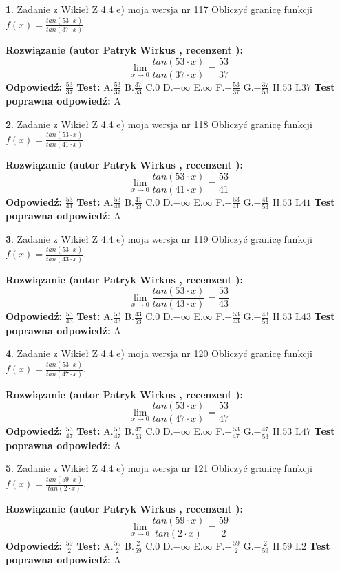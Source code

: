 \documentclass[12pt, a4paper]{article}
\theoremstyle{definition} %
\newtheorem{zad}{}
\newcommand{\zadStart}[1]{\begin{zad}#1\newline}
\newcommand{\zadStop}{\end{zad}}
\newcommand{\rozwStart}[2]{\noindent \textbf{Rozwiązanie (autor #1 , recenzent #2): }\newline}
\newcommand{\rozwStop}{\newline}
\newcommand{\odpStart}{\noindent \textbf{Odpowiedź:}\newline}
\newcommand{\odpStop}{\newline}
\newcommand{\testStart}{\noindent \textbf{Test:}\newline}
\newcommand{\testStop}{\newline}
\newcommand{\kluczStart}{\noindent \textbf{Test poprawna odpowiedź:}\newline}
\newcommand{\kluczStop}{\newline}
\begin{document}
\zadStart{Zadanie z Wikieł Z 4.4 e) moja wersja nr 117}
Obliczyć granicę funkcji $f(x)=\frac{tan(53\cdot x)}{tan(37\cdot x)}$.
\zadStop
\rozwStart{Patryk Wirkus}{}
$$\lim\limits_{x\to 0}\frac{tan(53\cdot x)}{tan(37\cdot x)}=
\frac{53}{37}$$
\rozwStop
\odpStart
$\frac{53}{37}$
\odpStop
\testStart
A.$\frac{53}{37}$
B.$\frac{37}{53}$
C.$0$
D.$-\infty$
E.$\infty$
F.$-\frac{53}{37}$
G.$-\frac{37}{53}$
H.$53$
I.$37$
\testStop
\kluczStart
A
\kluczStop



\zadStart{Zadanie z Wikieł Z 4.4 e) moja wersja nr 118}
Obliczyć granicę funkcji $f(x)=\frac{tan(53\cdot x)}{tan(41\cdot x)}$.
\zadStop
\rozwStart{Patryk Wirkus}{}
$$\lim\limits_{x\to 0}\frac{tan(53\cdot x)}{tan(41\cdot x)}=
\frac{53}{41}$$
\rozwStop
\odpStart
$\frac{53}{41}$
\odpStop
\testStart
A.$\frac{53}{41}$
B.$\frac{41}{53}$
C.$0$
D.$-\infty$
E.$\infty$
F.$-\frac{53}{41}$
G.$-\frac{41}{53}$
H.$53$
I.$41$
\testStop
\kluczStart
A
\kluczStop



\zadStart{Zadanie z Wikieł Z 4.4 e) moja wersja nr 119}
Obliczyć granicę funkcji $f(x)=\frac{tan(53\cdot x)}{tan(43\cdot x)}$.
\zadStop
\rozwStart{Patryk Wirkus}{}
$$\lim\limits_{x\to 0}\frac{tan(53\cdot x)}{tan(43\cdot x)}=
\frac{53}{43}$$
\rozwStop
\odpStart
$\frac{53}{43}$
\odpStop
\testStart
A.$\frac{53}{43}$
B.$\frac{43}{53}$
C.$0$
D.$-\infty$
E.$\infty$
F.$-\frac{53}{43}$
G.$-\frac{43}{53}$
H.$53$
I.$43$
\testStop
\kluczStart
A
\kluczStop



\zadStart{Zadanie z Wikieł Z 4.4 e) moja wersja nr 120}
Obliczyć granicę funkcji $f(x)=\frac{tan(53\cdot x)}{tan(47\cdot x)}$.
\zadStop
\rozwStart{Patryk Wirkus}{}
$$\lim\limits_{x\to 0}\frac{tan(53\cdot x)}{tan(47\cdot x)}=
\frac{53}{47}$$
\rozwStop
\odpStart
$\frac{53}{47}$
\odpStop
\testStart
A.$\frac{53}{47}$
B.$\frac{47}{53}$
C.$0$
D.$-\infty$
E.$\infty$
F.$-\frac{53}{47}$
G.$-\frac{47}{53}$
H.$53$
I.$47$
\testStop
\kluczStart
A
\kluczStop



\zadStart{Zadanie z Wikieł Z 4.4 e) moja wersja nr 121}
Obliczyć granicę funkcji $f(x)=\frac{tan(59\cdot x)}{tan(2\cdot x)}$.
\zadStop
\rozwStart{Patryk Wirkus}{}
$$\lim\limits_{x\to 0}\frac{tan(59\cdot x)}{tan(2\cdot x)}=
\frac{59}{2}$$
\rozwStop
\odpStart
$\frac{59}{2}$
\odpStop
\testStart
A.$\frac{59}{2}$
B.$\frac{2}{59}$
C.$0$
D.$-\infty$
E.$\infty$
F.$-\frac{59}{2}$
G.$-\frac{2}{59}$
H.$59$
I.$2$
\testStop
\kluczStart
A
\kluczStop
\end{document}
